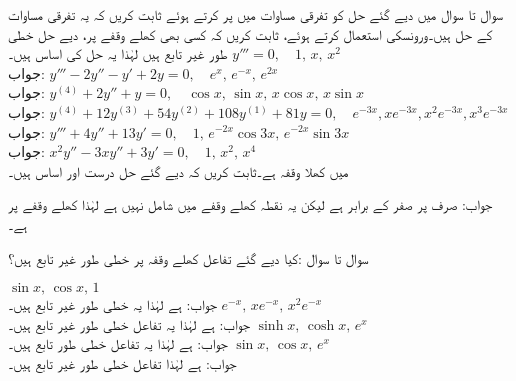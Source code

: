 سوال  تا سوال  میں دیے گئے حل کو تفرقی مساوات میں پر کرتے ہوئے ثابت کریں کہ یہ تفرقی مساوات کے حل ہیں۔ورونسکی استعمال کرتے ہوئے، ثابت کریں کہ کسی بھی کھلے وقفے پر،  دیے حل خطی طور غیر تابع ہیں لہٰذا یہ حل کی اساس ہیں۔
\quad 
$y'''=0,\quad 1,\, x,\, x^2$\\
جواب: 
\quad 
$y'''-2y''-y'+2y=0,\quad e^{x},\,  e^{-x},\, e^{2x}$\\
جواب:
\quad
$y^{(4)}+2y''+y=0,\quad \cos x,\, \sin x,\, x\cos x,\, x\sin x$\\
جواب:
 \quad
$y^{(4)}+12y^{(3)}+54y^{(2)}+108y^{(1)}+81y=0, \quad e^{-3x},xe^{-3x},x^2e^{-3x},x^3e^{-3x}$\\
جواب:
\quad
$y'''+4y''+13y'=0,\quad 1, \, e^{-2x}\cos 3x, \, e^{-2x} \sin 3x$\\
جواب:
\quad 
$x^2y''-3xy''+3y'=0,\quad 1,\, x^2,\,x^4$\\
میں  کھلا وقفہ  ہے۔ثابت کریں کہ دیے گئے حل درست  اور اساس ہیں۔

جواب: صرف  پر صفر کے برابر ہے لیکن یہ نقطہ کھلے وقفے میں شامل نہیں ہے لہٰذا کھلے وقفے پر  ہے۔

سوال  تا سوال :کیا دیے گئے تفاعل کھلے وقفہ  پر خطی طور غیر تابع ہیں؟

\quad
$\sin x, \, \cos x, \, 1$\\
جواب: ہے لہٰذا یہ خطی طور غیر تابع ہیں۔
\quad
$e^{-x},\, xe^{-x}, \, x^2e^{-x}$\\
جواب: ہے لہٰذا یہ تفاعل خطی طور غیر تابع ہیں۔
\quad
$\sinh x, \, \cosh x, \, e^{x}$\\
جواب: ہے لہٰذا یہ تفاعل خطی طور تابع ہیں۔
\quad
$\sin x, \, \cos x, \, e^x$\\
جواب: ہے لہٰذا تفاعل خطی طور غیر تابع ہیں۔

